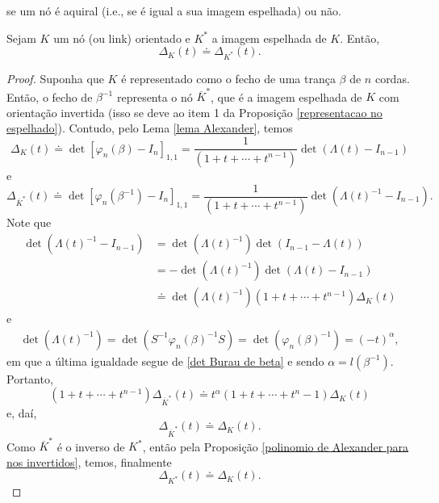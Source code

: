 	se um nó é aquiral (i.e., se é igual a sua imagem espelhada) ou não. 
	\begin{prop}
	\label{polinomio de Alexander para nos espelhados}
		Sejam $K$ um nó (ou link) orientado e $K^\ast$ a imagem espelhada de $K$. Então,
		\[
		    \Delta_K(t)\doteq\Delta_{K^\ast}(t).
		\]
	\end{prop}
	\begin{proof}
		Suponha que $K$ é representado como o fecho de uma trança $\beta$ de $n$ cordas. 
		Então, o fecho de $\beta^{-1}$ representa o nó $\overline{K}^{\ast}$, que é a 
		imagem espelhada de $K$ com orientação invertida (isso se deve ao item 1 da 
		Proposição \ref{representacao no espelhado}). Contudo, pelo Lema \ref{lema Alexander}, temos
		\begin{equation*}
		    \Delta_K(t) \doteq \det[\varphi_n(\beta) - I_n]_{1,1} 
		    = \frac{1}{(1+t+\cdots+t^{n-1})}\det(\Lambda(t) - I_{n-1})
		\end{equation*}
		e
		\begin{equation*}
		    \Delta_{\overline{K}^{\ast}}(t) \doteq \det[\varphi_n(\beta^{-1}) - I_n]_{1,1} 
		    = \frac{1}{(1+t+\cdots+t^{n-1})}\det(\Lambda(t)^{-1} - I_{n-1}).
		\end{equation*}
		Note que
		\begin{align*}
		    \det(\Lambda(t)^{-1} - I_{n-1}) &= \det(\Lambda(t)^{-1})\det(I_{n-1} - \Lambda(t)) \\
		    &= -\det(\Lambda(t)^{-1})\det(\Lambda(t) - I_{n-1}) \\
		    &\doteq \det(\Lambda(t)^{-1})(1+t+\cdots+t^{n-1})\Delta_K(t) 
		\end{align*}
		e
		\begin{align*}
		    \det(\Lambda(t)^{-1}) 
		    = \det( S^{-1}\varphi_n(\beta)^{-1}S ) 
		    = \det(\varphi_n(\beta)^{-1}) = (-t)^{\alpha},
		\end{align*}
		em que a última igualdade segue de \eqref{det Burau de beta} e sendo $\alpha = l(\beta^{-1})$. 
		Portanto, 
		\begin{equation*}
		    (1+t+\cdots+t^{n-1})\Delta_{\overline{K}^{\ast}}(t)\doteq t^{\alpha}(1+t+\cdots+t^n-1)\Delta_K(t)
		\end{equation*}
		e, daí,
		\begin{equation*}
		    \Delta_{\overline{K}^{\ast}}(t) \doteq \Delta_K(t).
		\end{equation*}
		Como $\overline{K}^{\ast}$ é o inverso de $K^\ast$, então pela 
		Proposição \ref{polinomio de Alexander para nos invertidos}, temos, finalmente
		\begin{equation*}
		    \Delta_{K^\ast}(t) \doteq \Delta_K(t).
		\end{equation*}
	\end{proof}
